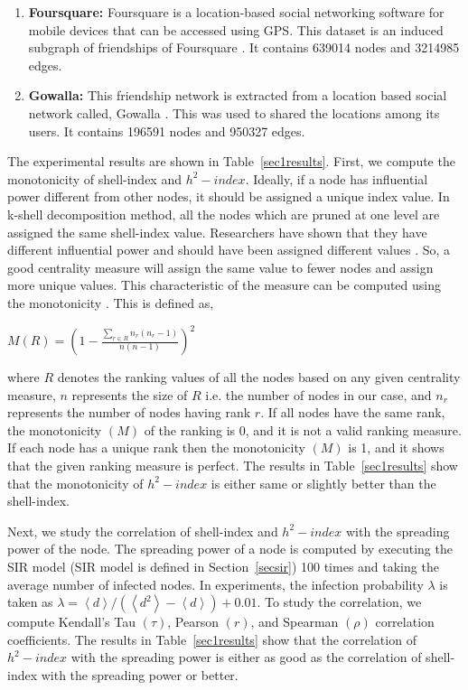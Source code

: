 \documentclass[12pt,3p]{article}
\begin{document}
\begin{enumerate}
\item \textbf{Foursquare:} Foursquare is a location-based social networking software for mobile devices that can be accessed using GPS. This dataset is an induced subgraph of friendships of Foursquare  \cite{zafarani2009social}. It contains 639014 nodes and 3214985 edges.

\item \textbf{Gowalla:} This friendship network is extracted from a location based social network called, Gowalla \cite{cho2011friendship}. This was used to shared the locations among its users. It contains 196591 nodes and 950327 edges.

\end{enumerate}

The experimental results are shown in Table~\ref{sec1results}. First, we compute the monotonicity of shell-index and $h^2-index$. Ideally, if a node has influential power different from other nodes, it should be assigned a unique index value. In k-shell decomposition method, all the nodes which are pruned at one level are assigned the same shell-index value. Researchers have shown that they have different influential power and should have been assigned different values \cite{zareie2018hierarchical, wang2016fast, zeng2013ranking}. So, a good centrality measure will assign the same value to fewer nodes and assign more unique values. This characteristic of the measure can be computed using the monotonicity \cite{bae2014identifying}. This is defined as,

\begin{center}
$M(R)=\left( 1-\frac{\sum_{r \in R}n_r(n_r-1)}{n(n-1)} \right) ^2$
\end{center}

where $R$ denotes the ranking values of all the nodes based on any given centrality measure, $n$ represents the size of $R$ i.e. the number of nodes in our case, and $n_r$ represents the number of nodes having rank $r$. If all nodes have the same rank, the monotonicity $(M)$ of the ranking is 0, and it is not a valid ranking measure. If each node has a unique rank then the monotonicity $(M)$ is 1, and it shows that the given ranking measure is perfect. The results in Table~\ref{sec1results} show that the monotonicity of $h^2-index$ is either same or slightly better than the shell-index. 

Next, we study the correlation of shell-index and $h^2-index$ with the spreading power of the node. The spreading power of a node is computed by executing the SIR model (SIR model is defined in Section~\ref{secsir}) 100 times and taking the average number of infected nodes. In experiments, the infection probability $\lambda$ is taken as $\lambda=\left \langle d \right \rangle/(\left \langle d^2 \right \rangle - \left \langle d \right \rangle) + 0.01$. To study the correlation, we compute Kendall's Tau $(\tau)$, Pearson $(r)$, and Spearman $(\rho)$ correlation coefficients. The results in Table~\ref{sec1results} show that the correlation of $h^2-index$ with the spreading power is either as good as the correlation of shell-index with the spreading power or better.
\end{document}
